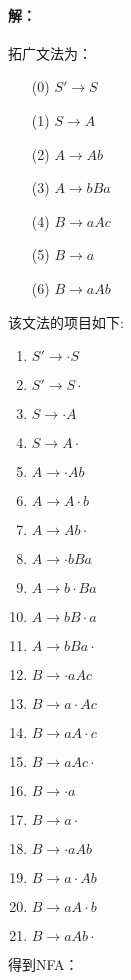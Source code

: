 \paragraph{解：}
拓广文法为：
\begin{center}
	\begin{enumerate}
		\centering
		\item[(0)] $S' \to S$
		\item[(1)] $S \to A$ 
		\item[(2)] $A \to Ab$
		\item[(3)] $A \to bBa$
		\item[(4)] $B \to aAc$
		\item[(5)] $B \to a$
		\item[(6)] $B \to aAb$
	\end{enumerate}
\end{center}
该文法的项目如下:
\begin{center}
	\begin{enumerate}
		\centering
		\item $S' \to \cdot S$
		\item $S' \to S \cdot$
		\item $S \to \cdot A$
		\item $S \to A \cdot$
		\item $A \to \cdot Ab$
		\item $A \to A \cdot b$
		\item $A \to Ab \cdot$
		\item $A \to \cdot bBa$
		\item $A \to b \cdot Ba$
		\item $A \to bB \cdot a$
		\item $A \to bBa \cdot$
		\item $B \to \cdot aAc$
		\item $B \to a \cdot Ac$
		\item $B \to aA \cdot c$
		\item $B \to aAc \cdot$
		\item $B \to \cdot a$
		\item $B \to a \cdot$
		\item $B \to \cdot aAb$
		\item $B \to a \cdot Ab$
		\item $B \to aA \cdot b$
		\item $B \to aAb \cdot$
	\end{enumerate}
\end{center}
\newpage
得到NFA：
